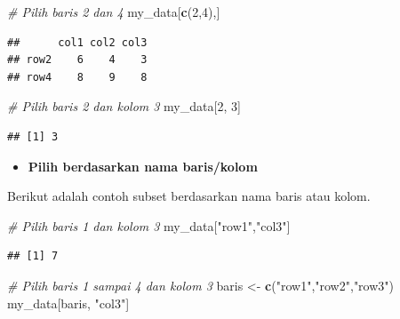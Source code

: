 \documentclass[]{book}
\newenvironment{Shaded}{\begin{snugshade}}{\end{snugshade}}
\newcommand{\KeywordTok}[1]{\textcolor[rgb]{0.13,0.29,0.53}{\textbf{#1}}}
\newcommand{\DecValTok}[1]{\textcolor[rgb]{0.00,0.00,0.81}{#1}}
\newcommand{\StringTok}[1]{\textcolor[rgb]{0.31,0.60,0.02}{#1}}
\newcommand{\CommentTok}[1]{\textcolor[rgb]{0.56,0.35,0.01}{\textit{#1}}}
\newcommand{\NormalTok}[1]{#1}
\providecommand{\tightlist}{%
  \setlength{\itemsep}{0pt}\setlength{\parskip}{0pt}}
\begin{document}
\begin{Shaded}
\begin{Highlighting}[]
\CommentTok{# Pilih baris 2 dan 4}
\NormalTok{my_data[}\KeywordTok{c}\NormalTok{(}\DecValTok{2}\NormalTok{,}\DecValTok{4}\NormalTok{),]}
\end{Highlighting}
\end{Shaded}

\begin{verbatim}
##      col1 col2 col3
## row2    6    4    3
## row4    8    9    8
\end{verbatim}

\begin{Shaded}
\begin{Highlighting}[]
\CommentTok{# Pilih baris 2 dan kolom 3}
\NormalTok{my_data[}\DecValTok{2}\NormalTok{, }\DecValTok{3}\NormalTok{]}
\end{Highlighting}
\end{Shaded}

\begin{verbatim}
## [1] 3
\end{verbatim}

\begin{itemize}
\tightlist
\item
  \textbf{Pilih berdasarkan nama baris/kolom}
\end{itemize}

Berikut adalah contoh subset berdasarkan nama baris atau kolom.

\begin{Shaded}
\begin{Highlighting}[]
\CommentTok{# Pilih baris 1 dan kolom 3}
\NormalTok{my_data[}\StringTok{"row1"}\NormalTok{,}\StringTok{"col3"}\NormalTok{]}
\end{Highlighting}
\end{Shaded}

\begin{verbatim}
## [1] 7
\end{verbatim}

\begin{Shaded}
\begin{Highlighting}[]
\CommentTok{# Pilih baris 1 sampai 4 dan kolom 3}
\NormalTok{baris <-}\StringTok{ }\KeywordTok{c}\NormalTok{(}\StringTok{"row1"}\NormalTok{,}\StringTok{"row2"}\NormalTok{,}\StringTok{"row3"}\NormalTok{)}
\NormalTok{my_data[baris, }\StringTok{"col3"}\NormalTok{]}
\end{Highlighting}
\end{Shaded}
\end{document}
